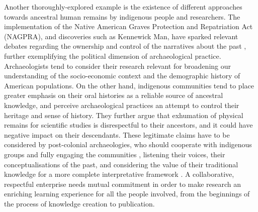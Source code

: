 		Another thoroughly-explored example is the existence of different approaches towards ancestral human remains by indigenous people and researchers. The implementation of the Native American Graves Protection and Repatriation Act (NAGPRA), and discoveries such as Kennewick Man, have sparked relevant debates regarding the ownership and control of the narratives about the past \parencite{Bruning_2006}, further exemplifying the political dimension of archaeological practice. Archaeologists tend to consider their research relevant for broadening our understanding of the socio-economic context and the demographic history of American populations. On the other hand, indigenous communities tend to place greater emphasis on their oral histories as a reliable source of ancestral knowledge, and perceive archaeological practices an attempt to control their heritage and sense of history. They further argue that exhumation of physical remains for scientific studies is disrespectful to their ancestors, and it could have negative impact on their descendants. These legitimate claims have to be considered by post-colonial archaeologies, who should cooperate with indigenous groups and fully engaging the communities \parencite{Hodder_2010}, listening their voices, their conceptualisations of the past, and considering the value of their traditional knowledge for a more complete interpretative framework \parencites{Wilcox_2010}[cf. for perspectives on archaeology in Africa:][] {Pikirayi_2015}. A collaborative, respectful enterprise needs mutual commitment in order to make research an enriching learning experience for all the people involved, from the beginnings of the process of knowledge creation to publication.
		
